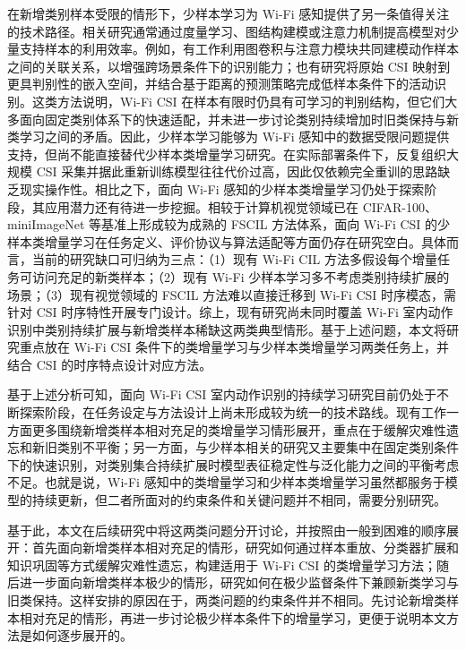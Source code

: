 在新增类别样本受限的情形下，少样本学习为 Wi-Fi 感知提供了另一条值得关注的技术路径。相关研究通常通过度量学习、图结构建模或注意力机制提高模型对少量支持样本的利用效率。例如，有工作利用图卷积与注意力模块共同建模动作样本之间的关联关系，以增强跨场景条件下的识别能力\cite{zhang2021csigdam}；也有研究将原始 CSI 映射到更具判别性的嵌入空间，并结合基于距离的预测策略完成低样本条件下的活动识别\cite{ding2021oneshot}。这类方法说明，Wi-Fi CSI 在样本有限时仍具有可学习的判别结构，但它们大多面向固定类别体系下的快速适配，并未进一步讨论类别持续增加时旧类保持与新类学习之间的矛盾。因此，少样本学习能够为 Wi-Fi 感知中的数据受限问题提供支持，但尚不能直接替代少样本类增量学习研究。在实际部署条件下，反复组织大规模 CSI 采集并据此重新训练模型往往代价过高，因此仅依赖完全重训的思路缺乏现实操作性。相比之下，面向 Wi-Fi 感知的少样本类增量学习仍处于探索阶段，其应用潜力还有待进一步挖掘。相较于计算机视觉领域已在 CIFAR-100、miniImageNet 等基准上形成较为成熟的 FSCIL 方法体系，面向 Wi-Fi CSI 的少样本类增量学习在任务定义、评价协议与算法适配等方面仍存在研究空白。具体而言，当前的研究缺口可归纳为三点：（1）现有 Wi-Fi CIL 方法多假设每个增量任务可访问充足的新类样本；（2）现有 Wi-Fi 少样本学习多不考虑类别持续扩展的场景；（3）现有视觉领域的 FSCIL 方法难以直接迁移到 Wi-Fi CSI 时序模态，需针对 CSI 时序特性开展专门设计。综上，现有研究尚未同时覆盖 Wi-Fi 室内动作识别中类别持续扩展与新增类样本稀缺这两类典型情形。基于上述问题，本文将研究重点放在 Wi-Fi CSI 条件下的类增量学习与少样本类增量学习两类任务上，并结合 CSI 的时序特点设计对应方法。

基于上述分析可知，面向 Wi-Fi CSI 室内动作识别的持续学习研究目前仍处于不断探索阶段，在任务设定与方法设计上尚未形成较为统一的技术路线。现有工作一方面更多围绕新增类样本相对充足的类增量学习情形展开，重点在于缓解灾难性遗忘和新旧类别不平衡；另一方面，与少样本相关的研究又主要集中在固定类别条件下的快速识别，对类别集合持续扩展时模型表征稳定性与泛化能力之间的平衡考虑不足。也就是说，Wi-Fi 感知中的类增量学习和少样本类增量学习虽然都服务于模型的持续更新，但二者所面对的约束条件和关键问题并不相同，需要分别研究。

基于此，本文在后续研究中将这两类问题分开讨论，并按照由一般到困难的顺序展开：首先面向新增类样本相对充足的情形，研究如何通过样本重放、分类器扩展和知识巩固等方式缓解灾难性遗忘，构建适用于 Wi-Fi CSI 的类增量学习方法；随后进一步面向新增类样本极少的情形，研究如何在极少监督条件下兼顾新类学习与旧类保持。这样安排的原因在于，两类问题的约束条件并不相同。先讨论新增类样本相对充足的情形，再进一步讨论极少样本条件下的增量学习，更便于说明本文方法是如何逐步展开的。


